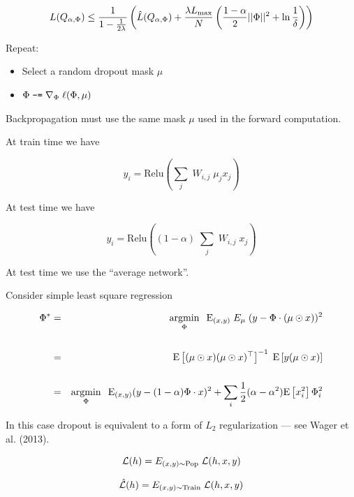 {$$L(Q_{\alpha,\Phi}) \leq \frac{1}{1-\frac{1}{2\lambda}}\left(\hat{L}(Q_{\alpha,\Phi}) + \frac{\lambda L_{\max}}{N}\left(\frac{1-\alpha}{2}||\Phi||^2 + \ln \frac{1}{\delta}\right)\right)$$


Repeat:

\vfill

\begin{itemize}
\item Select a random dropout mask $\mu$
  
\vfill
\item $\Phi \;\mbox{\tt -=}\; \nabla_\Phi\; \ell(\Phi, \mu)$
\end{itemize}

\vfill
Backpropagation must use the same mask $\mu$ used in the forward computation.



\vfill
At train time we have

\vfill
$$y_i = \mathrm{Relu}\left(\sum_j\;W_{i,j} \;\mu_j x_j\right)$$


\vfill
At test time we have

\vfill
$$y_i = \mathrm{Relu}\left((1-\alpha)\;\sum_j\;W_{i,j} \;x_j\right)$$

\vfill
At test time we use the ``average network''.


Consider simple least square regression

\begin{eqnarray*}
  \Phi^* & = &  \operatorname*{argmin}_\Phi\;\; \mathrm{E}_{(x,y)} \;E_{\mu}\;(y - \Phi \cdot (\mu \odot x))^2 \\
  \\
  & = & \mathrm{E}\left[(\mu\odot x)(\mu\odot x)^{\top}\right]^{-1}\; \mathrm{E}\left[y (\mu\odot x)\right] \\
  \\
  & = & \operatorname*{argmin}_\Phi\;\; \mathrm{E}_{(x,y)} (y - (1-\alpha) \Phi \cdot x)^2 + \sum_i\frac{1}{2}(\alpha - \alpha^2) \mathrm{E}\left[x_i^2\right] \Phi_i^2
\end{eqnarray*}

\vfill
In this case dropout is equivalent to a form of $L_2$ regularization --- see Wager et al. (2013).

$${\cal L}(h) = E_{(x,y)\sim \mathrm{Pop}}\;{\cal {\cal L}}(h,x,y)$$

\vfill
$$\hat{{\cal L}}(h) = E_{(x,y)\sim \mathrm{Train}}\;{\cal {\cal L}}(h,x,y)$$

}
